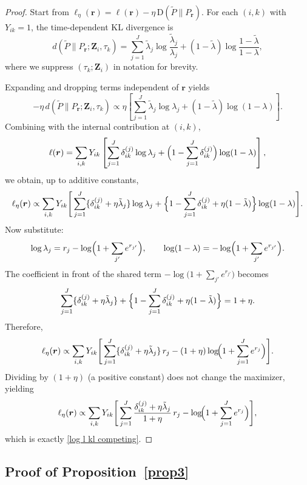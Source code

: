\documentclass{article}
\theoremstyle{plain}
\theoremstyle{definition}
\theoremstyle{remark}
\begin{document}
\begin{proof}
Start from $\ell_\eta(\bm r)=\ell(\bm r)-\eta\,\mathrm{D}(\tilde P\parallel P_{\bm r})$.
For each $(i,k)$ with $Y_{ik}=1$, the time-dependent KL divergence is
\[
d(\tilde P\parallel P_{\bm r};\bm Z_i,\tau_k)
=
\sum_{j=1}^J \tilde\lambda_j\log\frac{\tilde\lambda_j}{\lambda_j}
+(1-\tilde\lambda)\log\frac{1-\tilde\lambda}{1-\lambda},
\]
where we suppress $(\tau_k;\bm Z_i)$ in notation for brevity.

Expanding and dropping terms independent of $\bm r$ yields
\[
-\eta\,d(\tilde P\parallel P_{\bm r};\bm Z_i,\tau_k)
\propto
\eta\left[
\sum_{j=1}^J\tilde\lambda_j\log\lambda_j
+(1-\tilde\lambda)\log(1-\lambda)
\right].
\]
Combining with the internal contribution at $(i,k)$,
\[
\ell(\bm r)
=
\sum_{i,k}Y_{ik}\left[
\sum_{j=1}^J\delta_{ik}^{(j)}\log\lambda_j
+\Bigl(1-\sum_{j=1}^J\delta_{ik}^{(j)}\Bigr)\log(1-\lambda)
\right],
\]
we obtain, up to additive constants,
\begin{align*}
\ell_\eta(\bm r)
\propto
\sum_{i,k}Y_{ik}\Bigg[
\sum_{j=1}^J\{\delta_{ik}^{(j)}+\eta\tilde\lambda_j\}\log\lambda_j
+\Bigl\{1-\sum_{j=1}^J\delta_{ik}^{(j)}+\eta(1-\tilde\lambda)\Bigr\}\log(1-\lambda)
\Bigg].
\end{align*}
Now substitute:
\[
\log\lambda_j = r_j - \log\Bigl(1+\sum_{j'}e^{r_{j'}}\Bigr),\qquad
\log(1-\lambda)=-\log\Bigl(1+\sum_{j'}e^{r_{j'}}\Bigr).
\]
The coefficient in front of the shared term
$-\log\bigl(1+\sum_{j'}e^{r_{j'}}\bigr)$ becomes
\[
\sum_{j=1}^J\{\delta_{ik}^{(j)}+\eta\tilde\lambda_j\}
+\Bigl\{1-\sum_{j=1}^J\delta_{ik}^{(j)}+\eta(1-\tilde\lambda)\Bigr\}
=1+\eta.
\]
Therefore,
\begin{align*}
\ell_\eta(\bm r)
\propto
\sum_{i,k}Y_{ik}\Bigg[
\sum_{j=1}^J\{\delta_{ik}^{(j)}+\eta\tilde\lambda_j\}\,r_j
-(1+\eta)\log\!\Bigl(1+\sum_{j=1}^Je^{r_j}\Bigr)
\Bigg].
\end{align*}
Dividing by $(1+\eta)$ (a positive constant) does not change the maximizer, yielding
\[
\ell_\eta(\bm r)
\propto
\sum_{i,k}Y_{ik}\Bigg[
\sum_{j=1}^J\frac{\delta_{ik}^{(j)}+\eta\tilde\lambda_j}{1+\eta}\,r_j
-\log\!\Bigl(1+\sum_{j=1}^Je^{r_j}\Bigr)
\Bigg],
\]
which is exactly \eqref{log l kl competing}.
\end{proof}


\subsection{Proof of Proposition~\ref{prop3}}
\label{app:overall2cr}
\end{document}
